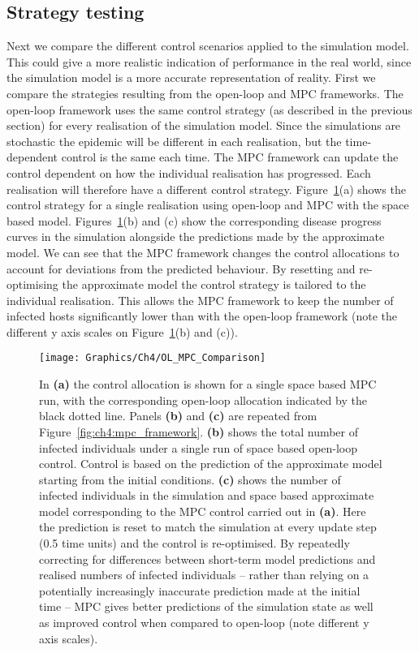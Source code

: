 \subsection{Strategy testing}

Next we compare the different control scenarios applied to the simulation model. This could give a more realistic indication of performance in the real world, since the simulation model is a more accurate representation of reality. First we compare the strategies resulting from the open-loop and MPC frameworks. The open-loop framework uses the same control strategy (as described in the previous section) for every realisation of the simulation model. Since the simulations are stochastic the epidemic will be different in each realisation, but the time-dependent control is the same each time. The MPC framework can update the control dependent on how the individual realisation has progressed. Each realisation will therefore have a different control strategy. Figure~\ref{fig:ch4:ol_mpc_comparison}(a) shows the control strategy for a single realisation using open-loop and MPC with the space based model. Figures~\ref{fig:ch4:ol_mpc_comparison}(b) and (c) show the corresponding disease progress curves in the simulation alongside the predictions made by the approximate model. We can see that the MPC framework changes the control allocations to account for deviations from the predicted behaviour. By resetting and re-optimising the approximate model the control strategy is tailored to the individual realisation. This allows the MPC framework to keep the number of infected hosts significantly lower than with the open-loop framework (note the different y axis scales on Figure~\ref{fig:ch4:ol_mpc_comparison}(b) and (c)).

\begin{figure}[h]
    \begin{center}
        \texttt{[image: Graphics/Ch4/OL\_MPC\_Comparison]}
        \caption[Comparing open-loop and MPC optimal strategies]{In \textbf{(a)} the control allocation is shown for a single space based MPC run, with the corresponding open-loop allocation indicated by the black dotted line. Panels \textbf{(b)} and \textbf{(c)} are repeated from Figure~\ref{fig:ch4:mpc_framework}. \textbf{(b)} shows the total number of infected individuals under a single run of space based open-loop control. Control is based on the prediction of the approximate model starting from the initial conditions. \textbf{(c)} shows the number of infected individuals in the simulation and space based approximate model corresponding to the MPC control carried out in \textbf{(a)}. Here the prediction is reset to match the simulation at every update step (0.5 time units) and the control is re-optimised. By repeatedly correcting for differences between short-term model predictions and realised numbers of infected individuals -- rather than relying on a potentially increasingly inaccurate prediction made at the initial time -- MPC gives better predictions of the simulation state as well as improved control when compared to open-loop (note different y axis scales).}
        \label{fig:ch4:ol_mpc_comparison}
    \end{center}
\end{figure}

